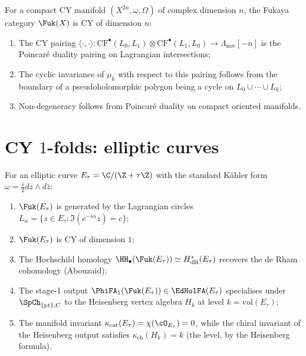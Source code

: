 \begin{proposition}
\label{prop:fukaya-cy}
For a compact CY manifold $(X^{2n}, \omega, \Omega)$ of complex
dimension $n$, the Fukaya category $\Fuk(X)$ is CY of dimension $n$:
\begin{enumerate}[label=(\roman*)]
 \item The CY pairing
 $\langle \cdot, \cdot \rangle \colon
 \mathrm{CF}^\bullet(L_0, L_1) \otimes
 \mathrm{CF}^\bullet(L_1, L_0)
 \to \Lambda_{\mathrm{nov}}[-n]$
 is the Poincar\'{e} duality pairing on Lagrangian intersections;
 \item The cyclic invariance of $\mu_k$ with respect to this pairing
 follows from the boundary of a pseudoholomorphic polygon being a
 cycle on $L_0 \cup \cdots \cup L_k$;
 \item Non-degeneracy follows from Poincar\'{e} duality on compact
 oriented manifolds.
\end{enumerate}
\end{proposition}


\section{CY \texorpdfstring{$1$}{1}-folds: elliptic curves}
\label{sec:fukaya-cy1}

\begin{example}
\label{ex:fukaya-elliptic}
For an elliptic curve $E_\tau = \C / (\Z + \tau\Z)$ with the
standard K\"ahler form $\omega = \frac{i}{2} dz \wedge d\bar{z}$:
\begin{enumerate}[label=(\roman*)]
 \item $\Fuk(E_\tau)$ is generated by the Lagrangian circles
 $L_\alpha = \{z \in E_\tau : \Im(e^{-i\alpha} z) = c\}$;
 \item $\Fuk(E_\tau)$ is CY of dimension $1$;
 \item The Hochschild homology
 $\HH_\bullet(\Fuk(E_\tau)) \simeq
 H^*_{\mathrm{dR}}(E_\tau)$ recovers the de Rham
 cohomology (Abouzaid);
 \item The stage-1 output $\PhiFA_1(\Fuk(E_\tau)) \in \EdHolFA(E_\tau)$
 specialises under $\SpCh_{\{\mathrm{pt}\}, C}$ to the Heisenberg
 vertex algebra $H_k$ at level $k = \mathrm{vol}(E_\tau)$;
 \item The manifold invariant $\kappa_{\mathrm{cat}}(E_\tau) =
 \chi(\cO_{E_\tau}) = 0$, while the chiral invariant of the
 Heisenberg output satisfies $\kappa_{\mathrm{ch}}(H_k) = k$
 (the level, by the Heisenberg formula).
\end{enumerate}
\end{example}

